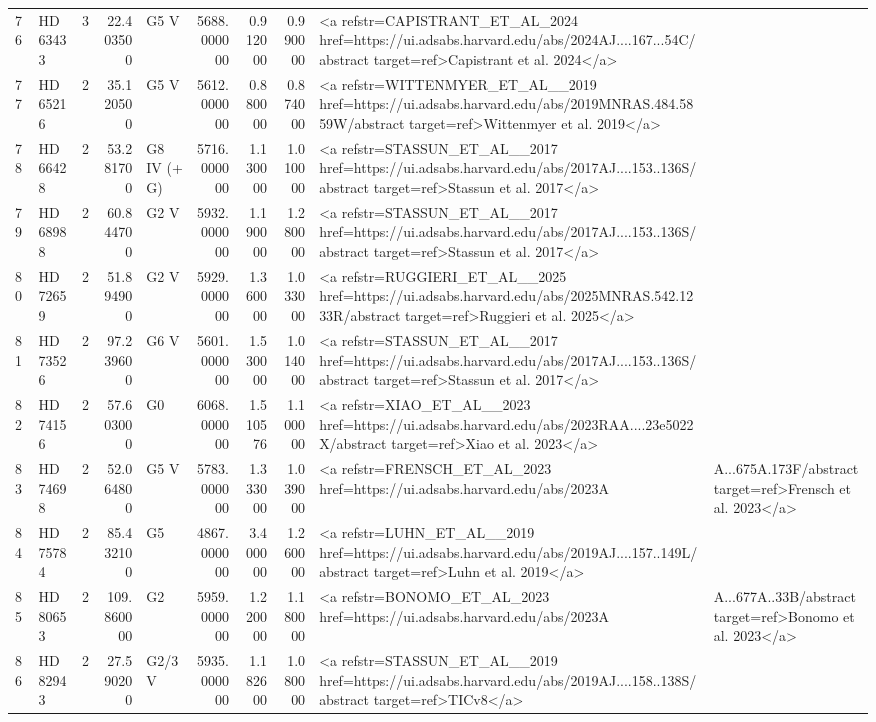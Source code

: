 \begin{tabular}{llrrlrrrl}
76 & HD 63433 & 3 & 22.403500 & G5 V & 5688.000000 & 0.912000 & 0.990000 & <a refstr=CAPISTRANT_ET_AL_2024 href=https://ui.adsabs.harvard.edu/abs/2024AJ....167...54C/abstract target=ref>Capistrant et al. 2024</a> \\
77 & HD 65216 & 2 & 35.120500 & G5 V & 5612.000000 & 0.880000 & 0.874000 & <a refstr=WITTENMYER_ET_AL__2019 href=https://ui.adsabs.harvard.edu/abs/2019MNRAS.484.5859W/abstract target=ref>Wittenmyer et al. 2019</a> \\
78 & HD 66428 & 2 & 53.281700 & G8 IV (+ G) & 5716.000000 & 1.130000 & 1.010000 & <a refstr=STASSUN_ET_AL__2017 href=https://ui.adsabs.harvard.edu/abs/2017AJ....153..136S/abstract target=ref>Stassun et al. 2017</a> \\
79 & HD 68988 & 2 & 60.844700 & G2 V & 5932.000000 & 1.190000 & 1.280000 & <a refstr=STASSUN_ET_AL__2017 href=https://ui.adsabs.harvard.edu/abs/2017AJ....153..136S/abstract target=ref>Stassun et al. 2017</a> \\
80 & HD 72659 & 2 & 51.894900 & G2 V & 5929.000000 & 1.360000 & 1.033000 & <a refstr=RUGGIERI_ET_AL__2025 href=https://ui.adsabs.harvard.edu/abs/2025MNRAS.542.1233R/abstract target=ref>Ruggieri et al. 2025</a> \\
81 & HD 73526 & 2 & 97.239600 & G6 V & 5601.000000 & 1.530000 & 1.014000 & <a refstr=STASSUN_ET_AL__2017 href=https://ui.adsabs.harvard.edu/abs/2017AJ....153..136S/abstract target=ref>Stassun et al. 2017</a> \\
82 & HD 74156 & 2 & 57.603000 & G0 & 6068.000000 & 1.510576 & 1.100000 & <a refstr=XIAO_ET_AL__2023 href=https://ui.adsabs.harvard.edu/abs/2023RAA....23e5022X/abstract target=ref>Xiao et al. 2023</a> \\
83 & HD 74698 & 2 & 52.064800 & G5 V & 5783.000000 & 1.333000 & 1.039000 & <a refstr=FRENSCH_ET_AL_2023 href=https://ui.adsabs.harvard.edu/abs/2023A&A...675A.173F/abstract target=ref>Frensch et al. 2023</a> \\
84 & HD 75784 & 2 & 85.432100 & G5 & 4867.000000 & 3.400000 & 1.260000 & <a refstr=LUHN_ET_AL__2019 href=https://ui.adsabs.harvard.edu/abs/2019AJ....157..149L/abstract target=ref>Luhn et al. 2019</a> \\
85 & HD 80653 & 2 & 109.860000 & G2 & 5959.000000 & 1.220000 & 1.180000 & <a refstr=BONOMO_ET_AL_2023 href=https://ui.adsabs.harvard.edu/abs/2023A&A...677A..33B/abstract target=ref>Bonomo et al. 2023</a> \\
86 & HD 82943 & 2 & 27.590200 & G2/3V & 5935.000000 & 1.182600 & 1.080000 & <a refstr=STASSUN_ET_AL__2019 href=https://ui.adsabs.harvard.edu/abs/2019AJ....158..138S/abstract target=ref>TICv8</a> \\

\end{tabular}
